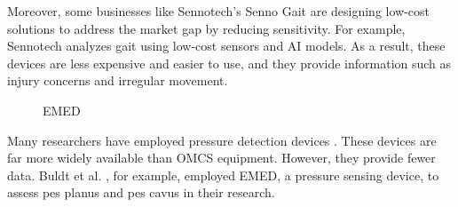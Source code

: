 Moreover, some businesses like Sennotech's Senno Gait are designing low-cost solutions to address the market gap by reducing sensitivity. For example, Sennotech \cite{sennotech_2021} analyzes gait using low-cost sensors and AI models. As a result, these devices are less expensive and easier to use, and they provide information such as injury concerns and irregular movement.

\begin{figure}[htbp]
\centering
{}
\caption{EMED \cite{articleFootPressure}}
\label{fig:BackgroundExampleEmed}
\end{figure}

Many researchers \cite{Buldt2018FootPI, articleKeukenkampDiabeticMedicine, BOSCH2010564} have employed pressure detection devices \cite{novel_2021, medilogic_2021}. These devices are far more widely available than OMCS equipment. However, they provide fewer data. Buldt et al. \cite{Buldt2018FootPI}, for example, employed EMED, a pressure sensing device, to assess pes planus and pes cavus in their research.